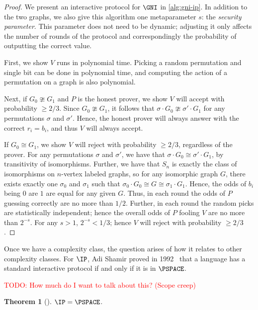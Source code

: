 \documentclass[english,12pt]{reedthesis}
\theoremstyle{plain}
\newtheorem{thm}{Theorem}[section]
\theoremstyle{definition}
\theoremstyle{remark}
\newcommand{\TODO}[1]{\textcolor{red}{TODO: #1}}
\begin{document}
\begin{proof}
  We present an interactive protocol for $\GNI$ in \cref{alg:gni-ip}. In
  addition to the two graphs, we also give this algorithm one metaparameter $s$:
  the \emph{security parameter}. This parameter does
  not need to be dynamic; adjusting it only affects the number of rounds of the
  protocol and correspondingly the probability of outputting the correct value.

  First, we show $V$ runs in polynomial time. Picking a random permutation and
  single bit can be done in polynomial time, and computing the action of a
  permutation on a graph is also polynomial.

  Next, if $G_{0} \ncong G_{1}$ and $P$ is the honest prover, we show $V$ will accept
  with probability $\ge 2/3$. Since $G_{0} \ncong G_{1}$, it follows that
  $\sigma \cdot G_{0} \ncong \sigma' \cdot G_{1}$ for any permutations $\sigma$ and $\sigma'$. Hence, the honest
  prover will always answer with the correct $r_{i} = b_{i}$, and thus $V$ will
  always accept.

  If $G_{0} \cong G_{1}$, we show $V$ will reject with probability $\ge 2/3$,
  regardless of the prover. For any permutations $\sigma$ and $\sigma'$, we have that
  $\sigma \cdot G_{0} \cong \sigma' \cdot G_{1}$, by transitivity of isomorphisms. Further, we have
  that $S_{n}$ is exactly the class of isomorphisms on $n$-vertex labeled
  graphs, so for any isomorphic graph $G$, there exists exactly one $\sigma_{0}$ and
  $\sigma_{1}$ such that $\sigma_{0} \cdot G_{0} \cong G \cong \sigma_{1} \cdot G_{1}$. Hence, the odds of
  $b_{i}$ being $0$ are $1$ are equal for any given $G$. Thus, in each round the
  odds of $P$ guessing correctly are no more than $1/2$. Further, in each round
  the random picks are statistically independent; hence the overall odds of $P$
  fooling $V$ are no more than $2^{-s}$. For any $s > 1$, $2^{-s} < 1/3$; hence
  $V$ will reject with probability $\ge 2/3$.
\end{proof}

Once we have a complexity class, the question arises of how it relates to other
complexity classes. For $\IP$, Adi Shamir proved in 1992~\cite{Sha92} that a
language has a standard interactive protocol if and only if it is in $\PSPACE$.

\TODO{How much do I want to talk about this? (Scope creep)}
\begin{thm}[{\cite{Sha92}}]\label{thm:ip-is-pspace}
  $\IP = \PSPACE$.
\end{thm}
\end{document}
